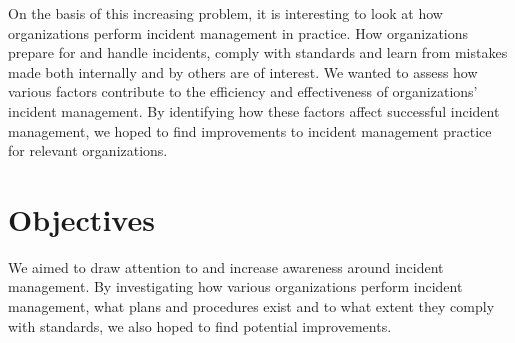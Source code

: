 On the basis of this increasing problem, it is interesting to look at how organizations perform incident management in practice. How organizations prepare for and handle incidents, comply with standards and learn from mistakes made both internally and by others are of interest. We wanted to assess how various factors contribute to the efficiency and effectiveness of organizations’ incident management. By identifying how these factors affect successful incident management, we hoped to find improvements to incident management practice for relevant organizations. 




\section{Objectives}
\label{sec:objectives}
We aimed to draw attention to and increase awareness around incident management. By investigating how various organizations perform incident management, what plans and procedures exist and to what extent they comply with standards, we also hoped to find potential improvements.


